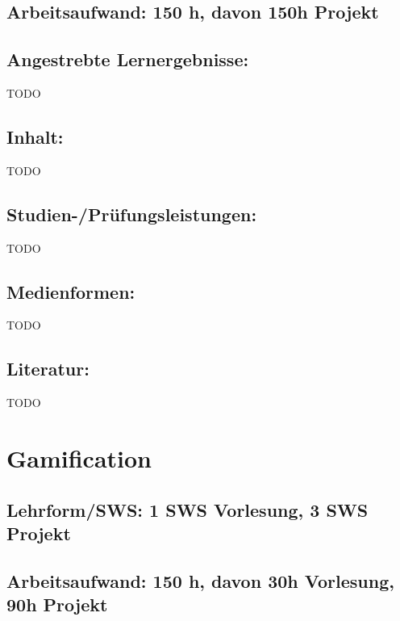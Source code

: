 \section{Arbeitsaufwand: 150 h, davon 150h
Projekt}\label{arbeitsaufwand-150-h-davon-150h-projekt}

\section{Angestrebte
Lernergebnisse:}\label{angestrebte-lernergebnisse-22}

TODO

\section{Inhalt:}\label{inhalt-22}

TODO

\section{Studien-/Prüfungsleistungen:}\label{studien-pruxfcfungsleistungen-22}

TODO

\section{Medienformen:}\label{medienformen-22}

TODO

\section{Literatur:}\label{literatur-22}

TODO

\chapter{Gamification}\label{gamification}

\section{Lehrform/SWS: 1 SWS Vorlesung, 3 SWS
Projekt}\label{lehrformsws-1-sws-vorlesung-3-sws-projekt}

\section{Arbeitsaufwand: 150 h, davon 30h Vorlesung, 90h
Projekt}\label{arbeitsaufwand-150-h-davon-30h-vorlesung-90h-projekt}

